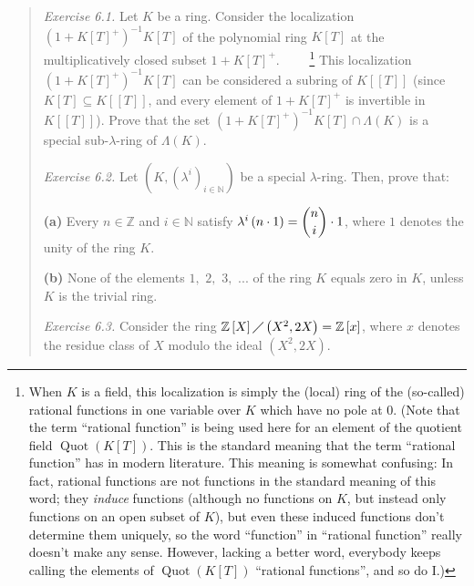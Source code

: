 \documentclass[numbers=enddot,12pt,final,onecolumn,notitlepage]{scrartcl}%
\begin{document}
\begin{quotation}
\textit{Exercise 6.1.} Let $K$ be a ring. Consider the localization $\left(
1+K\left[  T\right]  ^{+}\right)  ^{-1}K\left[  T\right]  $ of the polynomial
ring $K\left[  T\right]  $ at the multiplicatively closed subset $1+K\left[
T\right]  ^{+}$. \ \ \ \ \footnote{When $K$ is a field, this localization is
simply the (local) ring of the (so-called) rational functions in one variable
over $K$ which have no pole at $0$. (Note that the term ``rational function'' is
being used here for an element of the quotient field $\operatorname*{Quot}%
\left(  K\left[  T\right]  \right)  $. This is the standard meaning that the
term ``rational function'' has in modern literature. This meaning is somewhat
confusing: In fact, rational functions are not functions in the standard
meaning of this word; they \textit{induce} functions (although no functions on
$K$, but instead only functions on an open subset of $K$), but even these
induced functions don't determine them uniquely, so the word ``function'' in
``rational function'' really doesn't make any sense. However, lacking a better
word, everybody keeps calling the elements of $\operatorname*{Quot}\left(
K\left[  T\right]  \right)  $ ``rational functions'', and so do I.)} This
localization $\left(  1+K\left[  T\right]  ^{+}\right)  ^{-1}K\left[
T\right]  $ can be considered a subring of $K\left[  \left[  T\right]
\right]  $ (since $K\left[  T\right]  \subseteq K\left[  \left[  T\right]
\right]  $, and every element of $1+K\left[  T\right]  ^{+}$ is invertible in
$K\left[  \left[  T\right]  \right]  $). Prove that the set $\left(
1+K\left[  T\right]  ^{+}\right)  ^{-1}K\left[  T\right]  \cap\Lambda\left(
K\right)  $ is a special sub-$\lambda$-ring of $\Lambda\left(  K\right)  $.

\textit{Exercise 6.2.} Let $\left(  K,\left(  \lambda^{i}\right)
_{i\in\mathbb{N}}\right)  $ be a special $\lambda$-ring. Then, prove that:

\textbf{(a)} Every $n\in\mathbb{Z}$ and $i\in\mathbb{N}$ satisfy $\lambda
^{i}\left(  n\cdot1\right)  =\dbinom{n}{i}\cdot1$, where $1$ denotes the unity
of the ring $K$.

\textbf{(b)} None of the elements $1,$ $2,$ $3,$ $...$ of the ring $K$ equals
zero in $K$, unless $K$ is the trivial ring.

\textit{Exercise 6.3.} Consider the ring $\mathbb{Z}\left[  X\right]
\diagup\left(  X^{2},2X\right)  =\mathbb{Z}\left[  x\right]  $, where $x$
denotes the residue class of $X$ modulo the ideal $\left(  X^{2},2X\right)  $.


\end{quotation}
\end{document}
